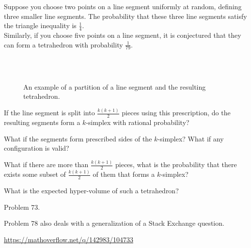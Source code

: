 \documentclass{article}
\begin{document}
  Suppose you choose two points on a line segment uniformly at random, defining
  three smaller line segments. The probability that these three line segments
  satisfy the triangle inequality is $\frac 14$.
  \\
  Similarly, if you choose five points on a line segment, it is conjectured that
  they can form a tetrahedron with probability $\frac 1{79}$.
\begin{figure}[ht!]
  \centering
  \\~\\
  \caption{
    An example of a partition of a line segment and the resulting tetrahedron.
  }
\end{figure}

\begin{question}
  If the line segment is split into $\frac{k(k+1)}{2}$ pieces using this
  prescription, do the resulting segments form a $k$-simplex with rational
  probability?
\end{question}

\begin{related}
  \item What if the segments form prescribed sides of the $k$-simplex? What if
    any configuration is valid?
  \item What if there are more than $\frac{k(k+1)}{2}$ pieces, what is the
    probability that there exists some subset of $\frac{k(k+1)}{2}$ of them that
    forms a $k$-simplex?
  \item What is the expected hyper-volume of such a tetrahedron?
\end{related}

\begin{references}
  \item Problem 73.
  \item Problem 78 also deals with a generalization of a Stack Exchange question.
  \item \url{https://mathoverflow.net/q/142983/104733}
\end{references}
\end{document}
